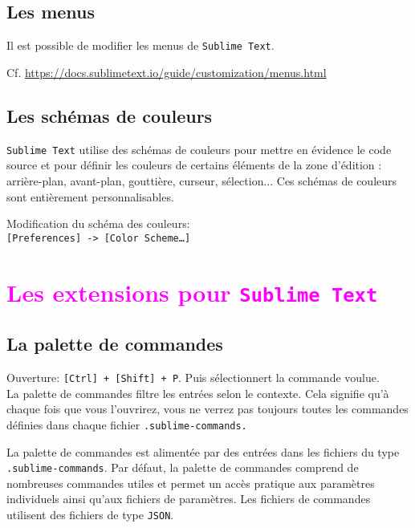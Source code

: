 \documentclass[french,a4paper]{article}
\begin{document}
\subsection*{Les menus}
Il est possible de modifier les menus de \texttt{Sublime Text}.

Cf. \url{https://docs.sublimetext.io/guide/customization/menus.html}
\bigskip

\subsection*{Les schémas de couleurs}

\texttt{Sublime Text} utilise des schémas de couleurs pour mettre en évidence
 le code source et pour définir les couleurs de certains éléments de la zone 
 d'édition : arrière-plan, avant-plan, gouttière, curseur, sélection... Ces 
 schémas de couleurs sont entièrement personnalisables.
 \medskip

 Modification du schéma des couleurs: \\
 \texttt{[Preferences] -> [Color Scheme\dots]}
\bigskip

\section{\textcolor{magenta}{Les extensions pour \texttt{Sublime Text}}}
\subsection*{La palette de commandes}
Ouverture: \texttt{[Ctrl] + [Shift] + P}. Puis sélectionnert la commande 
 voulue. \\
La palette de commandes filtre les entrées selon le contexte. Cela signifie
 qu'à chaque fois que vous l'ouvrirez, vous ne verrez pas toujours toutes les
 commandes définies dans chaque fichier \texttt{.sublime-commands.}
\medskip

La palette de commandes est alimentée par des entrées dans les fichiers du 
 type \texttt{.sublime-commands}. Par défaut, la palette de commandes comprend
 de nombreuses commandes utiles et permet un accès pratique aux paramètres 
 individuels ainsi qu'aux fichiers de paramètres. Les fichiers de commandes 
 utilisent des fichiers de type \texttt{JSON}.
\end{document}
